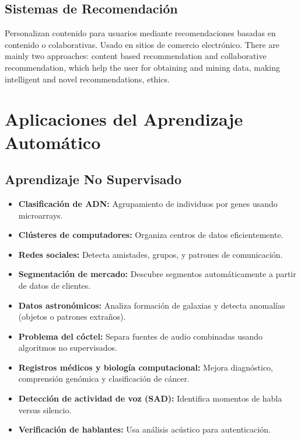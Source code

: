 \documentclass[12pt]{article}
\begin{document}
\subsection{Sistemas de Recomendaci\'on}
Personalizan contenido para usuarios mediante recomendaciones basadas en contenido o colaborativas. Usado en sitios de comercio electr\'onico. There are mainly two approaches: content based recommendation and collaborative recommendation, which help the user for obtaining and mining data, making intelligent and novel recommendations, ethics. 

\section{Aplicaciones del Aprendizaje Autom\'atico}
\subsection{Aprendizaje No Supervisado}
\begin{itemize}
  \item \textbf{Clasificaci\'on de ADN:} Agrupamiento de individuos por genes usando microarrays.
  \item \textbf{Cl\'usteres de computadores:} Organiza centros de datos eficientemente.
  \item \textbf{Redes sociales:} Detecta amistades, grupos, y patrones de comunicaci\'on.
  \item \textbf{Segmentaci\'on de mercado:} Descubre segmentos autom\'aticamente a partir de datos de clientes.
  \item \textbf{Datos astron\'omicos:} Analiza formaci\'on de galaxias y detecta anomal\'ias (objetos o patrones extra\~nos).
  \item \textbf{Problema del c\'octel:} Separa fuentes de audio combinadas usando algoritmos no supervisados.
  \item \textbf{Registros m\'edicos y biolog\'ia computacional:} Mejora diagn\'ostico, comprensi\'on gen\'omica y clasificaci\'on de c\'ancer.
  \item \textbf{Detecci\'on de actividad de voz (SAD):} Identifica momentos de habla versus silencio.
  \item \textbf{Verificaci\'on de hablantes:} Usa an\'alisis ac\'ustico para autenticaci\'on.
\end{itemize}
\end{document}
